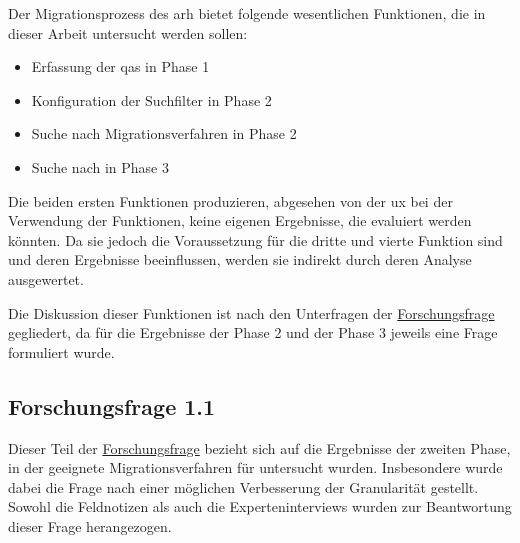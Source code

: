 Der Migrationsprozess des \gls{arh} bietet folgende wesentlichen Funktionen, die in dieser Arbeit untersucht werden sollen:
\begin{itemize}
	\item Erfassung der \glspl{qa} in Phase 1
	\item Konfiguration der Suchfilter in Phase 2
	\item Suche nach Migrationsverfahren in Phase 2
	\item Suche nach \bpp in Phase 3
\end{itemize}
Die beiden ersten Funktionen produzieren, abgesehen von der \gls{ux} bei der Verwendung der Funktionen, keine eigenen Ergebnisse, die evaluiert werden könnten.
Da sie jedoch die Voraussetzung für die dritte und vierte Funktion sind und deren Ergebnisse beeinflussen, werden sie indirekt durch deren Analyse ausgewertet.

Die Diskussion dieser Funktionen ist nach den Unterfragen der \hyperref[forschungsfrage:1]{Forschungsfrage} gegliedert, da für die Ergebnisse der Phase 2 und der Phase 3 jeweils eine Frage formuliert wurde.



\subsection{Forschungsfrage 1.1}

Dieser Teil der \hyperref[forschungsfrage:1]{Forschungsfrage} bezieht sich auf die Ergebnisse der zweiten Phase, in der geeignete Migrationsverfahren für \jf untersucht wurden. 
Insbesondere wurde dabei die Frage nach einer möglichen Verbesserung der Granularität gestellt.
Sowohl die Feldnotizen als auch die Experteninterviews wurden zur Beantwortung dieser Frage herangezogen.

